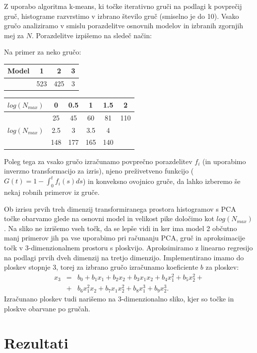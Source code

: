 \documentclass[a4paper]{IEEEtran}
\begin{document}
Z uporabo algoritma k-means, ki točke iterativno gruči na podlagi k povprečij gruč, histograme razvrstimo v izbrano število gruč (smiselno je do 10). Vsako gručo analiziramo v smislu porazdelitve osnovnih modelov in izbranih zgornjih mej za $N$. Porazdelitve izpišemo na sledeč način:

Na primer za neko gručo:
\begin{center}
	\begin{tabular}{ l|ccc } 
	Model & 1 & 2 & 3 \\ \hline
	 & 523 & 425 & 3
	\end{tabular}
\begin{tabular}{ l|ccccc } 
	$log(N_{max})$ & 0 &	0.5&1 &1.5 &2 \\ \hline
	&25 &45 &60 &81&110 \\ \hline\hline
	$log(N_{max})$ &2.5 &3 &	3.5&4 &\\ \hline
	&148 &177 &165 &140&
\end{tabular}
\end{center}

Poleg tega za vsako gručo izračunamo povprečno porazdelitev $f_i$ (in uporabimo inverzno transformacijo za izris), njeno preživetveno funkcijo ($G(t) = 1 - \int_0^t f_i(s) ds$) in konveksno ovojnico gruče, da lahko izberemo še nekaj robnih primerov iz gruče.

Ob izrisu prvih treh dimenzij transformiranega prostora histogramov s PCA točke obarvamo glede na osnovni model in velikost pike določimo kot $log(N_{max})$. Na sliko ne izrišemo vseh točk, da se lepše vidi in ker ima model 2 občutno manj primerov jih pa vse uporabimo pri računanju PCA, gruč in aproksimacije točk v 3-dimenzionalnem prostoru s ploskvijo. Aproksimiramo z linearno regresijo na podlagi prvih dveh dimenzij na tretjo dimenzijo. Implementirano imamo do ploskev stopnje 3, torej za izbrano gručo izračunamo koeficiente $b$ za ploskev: \begin{eqnarray}
x_3 &=& b_0 + b_1 x_1 + b_2 x_2 + b_3 x_1 x_2 + b_4 x_1^2 + b_5 x_2^2 + \nonumber \\
&+& b_6 x_1^2 x_2 + b_7 x_1 x_2^2 + b_8 x_1^3 + b_9 x_2^3. \nonumber
\end{eqnarray}
Izračunano ploskev tudi narišemo na 3-dimenzionalno sliko, kjer so točke in ploskve obarvane po gručah.

\section{Rezultati}
\end{document}
